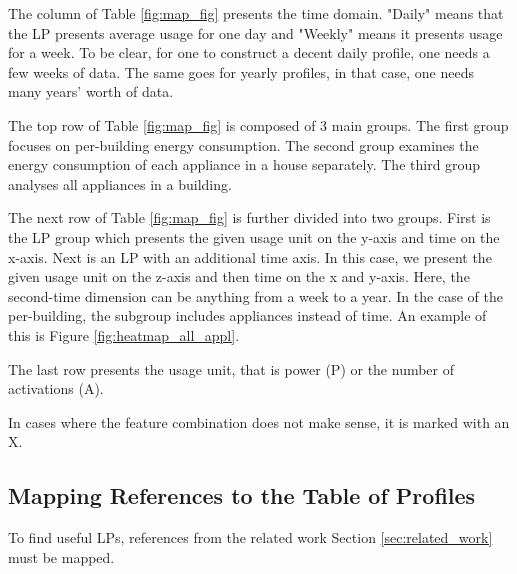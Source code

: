 The column of Table \ref{fig:map_fig} presents the time domain.
"Daily" means that the LP presents average usage for one day and "Weekly" means it presents usage for a week.
To be clear, for one to construct a decent daily profile, one needs a few weeks of data. 
The same goes for yearly profiles, in that case, one needs many years' worth of data. 

The top row of Table \ref{fig:map_fig} is composed of 3 main groups. 
The first group focuses on per-building energy consumption.
The second group examines the energy consumption of each appliance in a house separately.
The third group analyses all appliances in a building.

The next row of Table \ref{fig:map_fig} is further divided into two groups. 
First is the LP group which presents the given usage unit on the y-axis and time on the x-axis. 
Next is an LP with an additional time axis. 
In this case, we present the given usage unit on the z-axis and then time on the x and y-axis.
Here, the second-time dimension can be anything from a week to a year.
In the case of the per-building, the subgroup includes appliances instead of time. 
An example of this is Figure \ref{fig:heatmap_all_appl}.

The last row presents the usage unit, that is power (P) or the number of activations (A).

In cases where the feature combination does not make sense, it is marked with an X.

\subsection{Mapping References to the Table of Profiles}

To find useful LPs, references from the related work Section \ref{sec:related_work} must be mapped.

